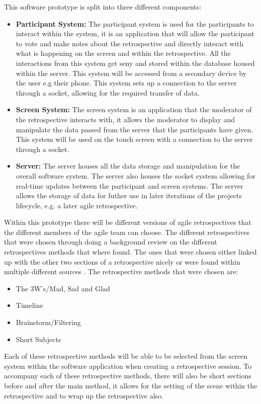This software prototype is split into three different components:
\begin{itemize}
\item \textbf{Participant System:} The participant system is used for the participants to interact within the system, it is an application that will allow the participant to vote and make notes about the retrospective and directly interact with what is happening on the screen and within the retrospective. All the interactions from this system get seny and stored within the database housed within the server. This system will be accessed from a secondary device by the user e.g their phone. This system sets up a connection to the server through a socket, allowing for the required transfer of data.
\item \textbf{Screen System:} The screen system is an application that the moderator of the retrospective interacts with, it allows the moderator to display and manipulate the data passed from the server that the participants have given. This system will be used on the touch screen with a connection to the server through a socket.  
\item \textbf{Server:} The server houses all the data storage and manipulation for the overall software system. The server also houses the socket system allowing for real-time updates between the participant and screen systems. The server allows the storage of data for futher use in later iterations of the projects lifecycle, e.g. a later agile retrospective. 
\end{itemize}

Within this prototype there will be different versions of agile retrospectives that the different members of the agile team can choose. The different retrospectives that were chosen through doing a background review on the different retrospectives methods that where found. The ones that were chosen either linked up with the other two sections of a retrospective nicely or were found within multiple different sources \cite{AgileRetrospectivesEstherDerby, normanKeith}. The retrospective methods that were chosen are:
\begin{itemize}
\item The 3W's/Mad, Sad and Glad
\item Timeline
\item Brainstorm/Filtering
\item Short Subjects
\end{itemize}

Each of these retrospective methods will be able to be selected from the screen system within the software application when creating a retrospective session. To accompany each of these retrospective methods, there will also be short sections before and after the main method, it allows for the setting of the scene within the retrospective and to wrap up the retrospective also.


